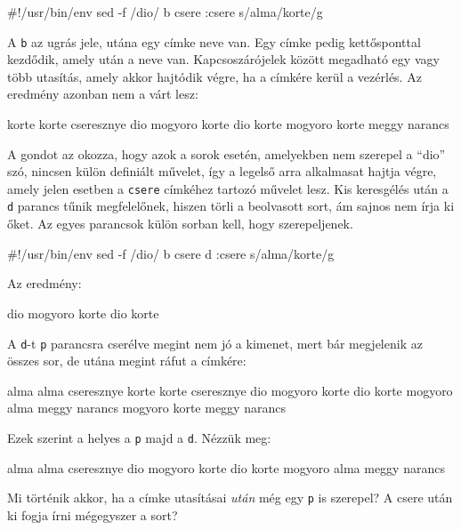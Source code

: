 \begin{VerbExample}
#!/usr/bin/env sed -f
/dio/ b csere
:csere
{ s/alma/korte/g }
\end{VerbExample}

A \texttt{b} az ugrás jele, utána egy címke neve van. Egy címke pedig
kettősponttal kezdődik, amely után a neve van. Kapcsoszárójelek között megadható
egy vagy több utasítás, amely akkor hajtódik végre, ha a címkére kerül a
vezérlés. Az eredmény azonban nem a várt lesz:

\begin{VerbExample}
korte korte cseresznye
dio mogyoro korte
dio korte
mogyoro korte meggy narancs
\end{VerbExample}

A gondot az okozza, hogy azok a sorok esetén, amelyekben nem szerepel a ``dio''
szó,  nincsen külön definiált művelet, így a legelső arra alkalmasat hajtja
végre, amely jelen esetben a \texttt{csere} címkéhez tartozó művelet lesz. Kis
keresgélés után a \texttt{d} parancs tűnik megfelelőnek, hiszen törli a
beolvasott sort, ám sajnos nem írja ki őket. Az egyes parancsok külön sorban
kell, hogy szerepeljenek.

\begin{VerbExample}
#!/usr/bin/env sed -f
/dio/ b csere
d
:csere
{ s/alma/korte/g }
\end{VerbExample}

\noindent Az eredmény:

\begin{VerbExample}
dio mogyoro korte
dio korte
\end{VerbExample}

\noindent A \texttt{d}-t \texttt{p} parancsra cserélve megint nem jó a kimenet,
mert bár megjelenik az összes sor, de utána megint ráfut a címkére:

\begin{VerbExample}
alma alma cseresznye
korte korte cseresznye
dio mogyoro korte
dio korte
mogyoro alma meggy narancs
mogyoro korte meggy narancs
\end{VerbExample}

\noindent Ezek szerint a helyes a \texttt{p} majd a \texttt{d}. Nézzük meg:

\begin{VerbExample}
alma alma cseresznye
dio mogyoro korte
dio korte
mogyoro alma meggy narancs
\end{VerbExample}

\noindent Mi történik akkor, ha a címke utasításai \emph{után} még egy
\texttt{p} is szerepel? A csere után ki fogja írni mégegyszer a sort?


